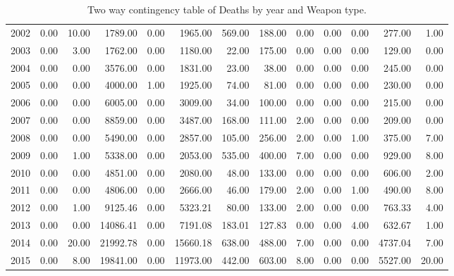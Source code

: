 \begin{sidewaystable}
{\begin{tabular}{rrrrrrrrrrrrr}
  2002 & 0.00 & 10.00 & 1789.00 & 0.00 & 1965.00 & 569.00 & 188.00 & 0.00 & 0.00 & 0.00 & 277.00 & 1.00 \\ 
  2003 & 0.00 & 3.00 & 1762.00 & 0.00 & 1180.00 & 22.00 & 175.00 & 0.00 & 0.00 & 0.00 & 129.00 & 0.00 \\ 
  2004 & 0.00 & 0.00 & 3576.00 & 0.00 & 1831.00 & 23.00 & 38.00 & 0.00 & 0.00 & 0.00 & 245.00 & 0.00 \\ 
  2005 & 0.00 & 0.00 & 4000.00 & 1.00 & 1925.00 & 74.00 & 81.00 & 0.00 & 0.00 & 0.00 & 230.00 & 0.00 \\ 
  2006 & 0.00 & 0.00 & 6005.00 & 0.00 & 3009.00 & 34.00 & 100.00 & 0.00 & 0.00 & 0.00 & 215.00 & 0.00 \\ 
  2007 & 0.00 & 0.00 & 8859.00 & 0.00 & 3487.00 & 168.00 & 111.00 & 2.00 & 0.00 & 0.00 & 209.00 & 0.00 \\ 
  2008 & 0.00 & 0.00 & 5490.00 & 0.00 & 2857.00 & 105.00 & 256.00 & 2.00 & 0.00 & 1.00 & 375.00 & 7.00 \\ 
  2009 & 0.00 & 1.00 & 5338.00 & 0.00 & 2053.00 & 535.00 & 400.00 & 7.00 & 0.00 & 0.00 & 929.00 & 8.00 \\ 
  2010 & 0.00 & 0.00 & 4851.00 & 0.00 & 2080.00 & 48.00 & 133.00 & 0.00 & 0.00 & 0.00 & 606.00 & 2.00 \\ 
  2011 & 0.00 & 0.00 & 4806.00 & 0.00 & 2666.00 & 46.00 & 179.00 & 2.00 & 0.00 & 1.00 & 490.00 & 8.00 \\ 
  2012 & 0.00 & 1.00 & 9125.46 & 0.00 & 5323.21 & 80.00 & 133.00 & 2.00 & 0.00 & 0.00 & 763.33 & 4.00 \\ 
  2013 & 0.00 & 0.00 & 14086.41 & 0.00 & 7191.08 & 183.01 & 127.83 & 0.00 & 0.00 & 4.00 & 632.67 & 1.00 \\ 
  2014 & 0.00 & 20.00 & 21992.78 & 0.00 & 15660.18 & 638.00 & 488.00 & 7.00 & 0.00 & 0.00 & 4737.04 & 7.00 \\ 
  2015 & 0.00 & 8.00 & 19841.00 & 0.00 & 11973.00 & 442.00 & 603.00 & 8.00 & 0.00 & 0.00 & 5527.00 & 20.00 \\ 
   \hline
\end{tabular}}
\caption{Two way contingency table of Deaths by year and Weapon type.}
\label{tab:weaponsyear}
\end{sidewaystable}


